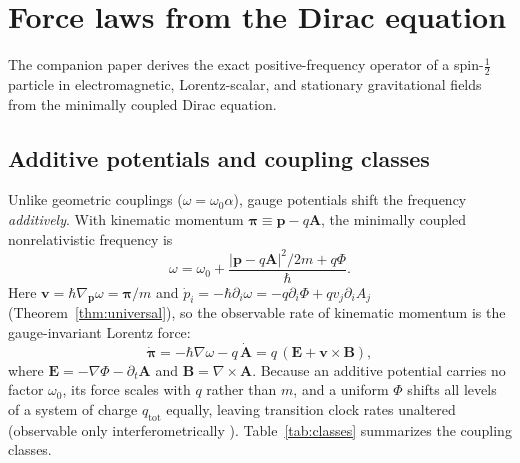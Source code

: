 \documentclass[aps,prd,onecolumn,tightenlines,nofootinbib,notitlepage,10pt,floatfix]{revtex4-2}
\theoremstyle{indentedtheorem}
\begin{document}
\section{Force laws from the Dirac equation}
\label{sec:potentials}

The companion paper \citep{HutchisonWavefn2026} derives the exact positive-frequency operator of a spin-$\tfrac{1}{2}$ particle in electromagnetic, Lorentz-scalar, and stationary gravitational fields from the minimally coupled Dirac equation.

\subsection{Additive potentials and coupling classes}
\label{sec:em}

Unlike geometric couplings ($\omega=\omega_0\alpha$), gauge potentials shift the frequency \emph{additively}. With kinematic momentum $\boldsymbol{\pi}\equiv\mathbf{p}-q\mathbf{A}$, the minimally coupled nonrelativistic frequency is
\begin{equation}
    \omega = \omega_0 + \frac{|\mathbf{p}-q\mathbf{A}|^2/2m + q\Phi}{\hbar} .
    \label{eq:omega_em}
\end{equation}
Here $\mathbf{v}=\hbar\nabla_{\mathbf{p}}\omega=\boldsymbol{\pi}/m$ and $\dot{p}_i=-\hbar\partial_i\omega=-q\partial_i\Phi+q v_j\partial_i A_j$ (Theorem~\ref{thm:universal}), so the observable rate of kinematic momentum is the gauge-invariant Lorentz force:
\begin{equation}
    \dot{\boldsymbol{\pi}} = -\hbar\nabla\omega - q\,\dot{\mathbf{A}} = q\,(\mathbf{E}+\mathbf{v}\times\mathbf{B}) ,
    \label{eq:lorentz}
\end{equation}
where $\mathbf{E}=-\nabla\Phi-\partial_t\mathbf{A}$ and $\mathbf{B}=\nabla\times\mathbf{A}$. Because an additive potential carries no factor $\omega_0$, its force scales with $q$ rather than $m$, and a uniform $\Phi$ shifts all levels of a system of charge $q_\text{tot}$ equally, leaving transition clock rates unaltered (observable only interferometrically \citep{Aharonov1959Significance}). Table~\ref{tab:classes} summarizes the coupling classes.
\end{document}
